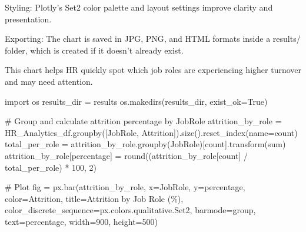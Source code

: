 \documentclass[
  letterpaper,
  DIV=11,
  numbers=noendperiod]{scrartcl}
\newenvironment{Shaded}{\begin{snugshade}}{\end{snugshade}}
\newcommand{\BuiltInTok}[1]{\textcolor[rgb]{0.00,0.23,0.31}{#1}}
\newcommand{\CommentTok}[1]{\textcolor[rgb]{0.37,0.37,0.37}{#1}}
\newcommand{\DecValTok}[1]{\textcolor[rgb]{0.68,0.00,0.00}{#1}}
\newcommand{\ImportTok}[1]{\textcolor[rgb]{0.00,0.46,0.62}{#1}}
\newcommand{\NormalTok}[1]{\textcolor[rgb]{0.00,0.23,0.31}{#1}}
\newcommand{\OperatorTok}[1]{\textcolor[rgb]{0.37,0.37,0.37}{#1}}
\newcommand{\StringTok}[1]{\textcolor[rgb]{0.13,0.47,0.30}{#1}}
\newcommand{\VariableTok}[1]{\textcolor[rgb]{0.07,0.07,0.07}{#1}}
\begin{document}
Styling: Plotly's Set2 color palette and layout settings improve clarity
and presentation.

Exporting: The chart is saved in JPG, PNG, and HTML formats inside a
results/ folder, which is created if it doesn't already exist.

This chart helps HR quickly spot which job roles are experiencing higher
turnover and may need attention.

\begin{Shaded}
\begin{Highlighting}[]
\ImportTok{import}\NormalTok{ os}
\NormalTok{results\_dir }\OperatorTok{=} \StringTok{\textquotesingle{}results\textquotesingle{}}
\NormalTok{os.makedirs(results\_dir, exist\_ok}\OperatorTok{=}\VariableTok{True}\NormalTok{)}

\CommentTok{\# Group and calculate attrition percentage by JobRole}
\NormalTok{attrition\_by\_role }\OperatorTok{=}\NormalTok{ HR\_Analytics\_df.groupby([}\StringTok{\textquotesingle{}JobRole\textquotesingle{}}\NormalTok{, }\StringTok{\textquotesingle{}Attrition\textquotesingle{}}\NormalTok{]).size().reset\_index(name}\OperatorTok{=}\StringTok{\textquotesingle{}count\textquotesingle{}}\NormalTok{)}
\NormalTok{total\_per\_role }\OperatorTok{=}\NormalTok{ attrition\_by\_role.groupby(}\StringTok{\textquotesingle{}JobRole\textquotesingle{}}\NormalTok{)[}\StringTok{\textquotesingle{}count\textquotesingle{}}\NormalTok{].transform(}\StringTok{\textquotesingle{}sum\textquotesingle{}}\NormalTok{)}
\NormalTok{attrition\_by\_role[}\StringTok{\textquotesingle{}percentage\textquotesingle{}}\NormalTok{] }\OperatorTok{=} \BuiltInTok{round}\NormalTok{((attrition\_by\_role[}\StringTok{\textquotesingle{}count\textquotesingle{}}\NormalTok{] }\OperatorTok{/}\NormalTok{ total\_per\_role) }\OperatorTok{*} \DecValTok{100}\NormalTok{, }\DecValTok{2}\NormalTok{)}

\CommentTok{\# Plot}
\NormalTok{fig }\OperatorTok{=}\NormalTok{ px.bar(attrition\_by\_role,}
\NormalTok{             x}\OperatorTok{=}\StringTok{\textquotesingle{}JobRole\textquotesingle{}}\NormalTok{,}
\NormalTok{             y}\OperatorTok{=}\StringTok{\textquotesingle{}percentage\textquotesingle{}}\NormalTok{,}
\NormalTok{             color}\OperatorTok{=}\StringTok{\textquotesingle{}Attrition\textquotesingle{}}\NormalTok{,}
\NormalTok{             title}\OperatorTok{=}\StringTok{\textquotesingle{}Attrition by Job Role (\%)\textquotesingle{}}\NormalTok{,}
\NormalTok{             color\_discrete\_sequence}\OperatorTok{=}\NormalTok{px.colors.qualitative.Set2,  }
\NormalTok{             barmode}\OperatorTok{=}\StringTok{\textquotesingle{}group\textquotesingle{}}\NormalTok{,}
\NormalTok{             text}\OperatorTok{=}\StringTok{\textquotesingle{}percentage\textquotesingle{}}\NormalTok{,}
\NormalTok{             width}\OperatorTok{=}\DecValTok{900}\NormalTok{,}
\NormalTok{             height}\OperatorTok{=}\DecValTok{500}\NormalTok{)}


\end{Highlighting}
\end{Shaded}
\end{document}
